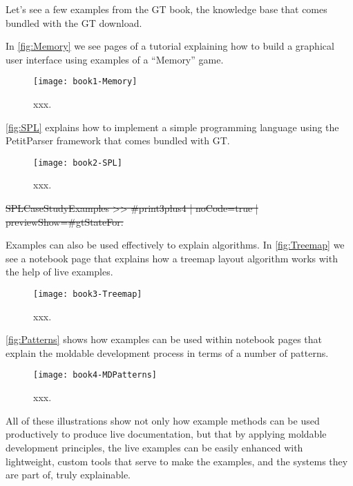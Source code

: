 \documentclass[sigplan,anonymous,review,10pt]{acmart}
\begin{document}
Let's see a few examples from the GT book, the knowledge base that comes bundled with the GT download.

In \autoref{fig:Memory} we see pages of a tutorial explaining how to build a graphical user interface using examples of a ``Memory'' game.


\begin{figure}[h]
  \texttt{[image: book1-Memory]}
  \caption{xxx.}
  \label{fig:Memory}
\end{figure}




\autoref{fig:SPL} explains how to implement a simple programming language using the PetitParser framework that comes bundled with GT.



\begin{figure}[h]
  \texttt{[image: book2-SPL]}
  \caption{xxx.}
  \label{fig:SPL}
\end{figure}

\st{SPLCaseStudyExamples >> #print3plus4 | noCode=true | previewShow=#gtStateFor:}


Examples can also be used effectively to explain algorithms.
In \autoref{fig:Treemap} we see a notebook page that explains how a treemap layout algorithm works with the help of live examples.



\begin{figure}[h]
  \texttt{[image: book3-Treemap]}
  \caption{xxx.}
  \label{fig:Treemap}
\end{figure}




\autoref{fig:Patterns} shows how examples can be used within notebook pages that explain the moldable development process in terms of a number of patterns.


\begin{figure}[h]
  \texttt{[image: book4-MDPatterns]}
  \caption{xxx.}
  \label{fig:Patterns}
\end{figure}




All of these illustrations show not only how example methods can be used productively to produce live documentation, but that by applying moldable development principles, the live examples can be easily enhanced with lightweight, custom tools that serve to make the examples, and the systems they are part of, truly explainable.
\end{document}
